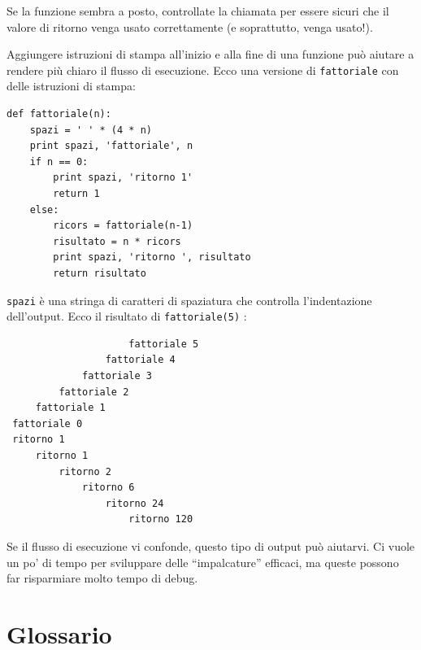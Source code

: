 \documentclass[10pt]{book}
\begin{document}
Se la funzione sembra a posto, controllate la chiamata per essere sicuri che il valore di ritorno venga usato correttamente (e soprattutto, venga usato!).

Aggiungere istruzioni di stampa all'inizio e alla fine di una funzione può aiutare a rendere più chiaro il flusso di esecuzione. Ecco una versione di {\tt fattoriale} con delle istruzioni di stampa:

\begin{verbatim}
def fattoriale(n):
    spazi = ' ' * (4 * n)
    print spazi, 'fattoriale', n
    if n == 0:
        print spazi, 'ritorno 1'
        return 1
    else:
        ricors = fattoriale(n-1)
        risultato = n * ricors
        print spazi, 'ritorno ', risultato
        return risultato
\end{verbatim}
%
{\tt spazi} è una stringa di caratteri di spaziatura che controlla l'indentazione dell'output. Ecco il risultato di {\tt fattoriale(5)} :

\begin{verbatim}
                     fattoriale 5
                 fattoriale 4
             fattoriale 3
         fattoriale 2
     fattoriale 1
 fattoriale 0
 ritorno 1
     ritorno 1
         ritorno 2
             ritorno 6
                 ritorno 24
                     ritorno 120
\end{verbatim}
%
Se il flusso di esecuzione vi confonde, questo tipo di output può aiutarvi. Ci vuole un po' di tempo per sviluppare delle ``impalcature'' efficaci, ma queste possono far risparmiare molto tempo di debug.


\section{Glossario}
\end{document}
